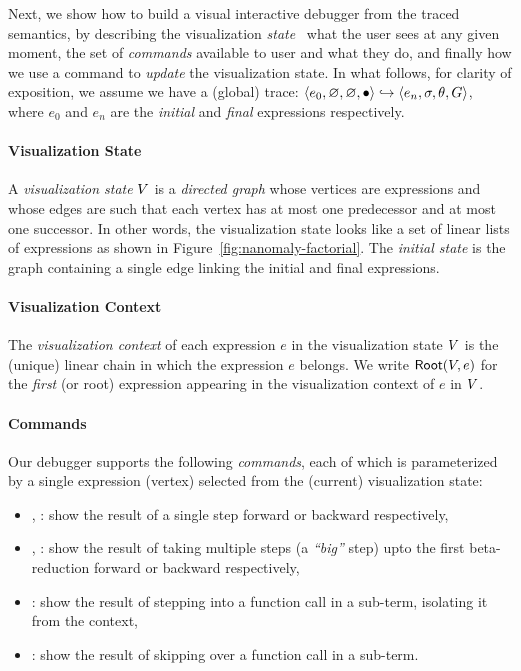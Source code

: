 Next, we show how to build a visual interactive debugger
from the traced semantics, by describing the visualization
\emph{state} \ie\ what the user sees at any given moment,
the set of \emph{commands} available to user and what
they do, and finally how we use a command to \emph{update}
the visualization state. In what follows, for clarity of
exposition, we assume we have a (global) trace:
$\langle e_0, \varnothing, \varnothing, \bullet \rangle \hookrightarrow \langle e_n, \sigma, \theta, G \rangle$, where
$e_0$ and $e_n$ are the \emph{initial} and \emph{final}
expressions respectively.

\paragraph{Visualization State}
%
A \emph{visualization state} $V$ is a \emph{directed graph}
whose vertices are expressions and whose edges are such
that each vertex has at most one predecessor and at most one
successor. In other words, the visualization state looks
like a set of linear lists of expressions as shown in
Figure~\ref{fig:nanomaly-factorial}.
%
The \emph{initial state} is the graph containing a single
edge linking the initial and final expressions.

\paragraph{Visualization Context}
%
The \emph{visualization context} of each expression $e$
in the visualization state $V$ is the (unique) linear chain
in which the expression $e$ belongs.
%
We write $\mathsf{Root}(V, e)$ for the \emph{first} (or root)
expression appearing in the visualization context of $e$ in
$V$.

\paragraph{Commands}
Our debugger supports the following \emph{commands}, each of which
is parameterized by a single expression (vertex) selected from the
(current) visualization state:
%
\begin{itemize}
%
\item \stepforwardsym, \stepbackwardsym:
      show the result of a single step forward or backward respectively,
%
\item \jumpforwardsym, \jumpbackwardsym:
      show the result of taking multiple steps (a \emph{``big''} step)
      upto the first beta-reduction forward or backward respectively,
%
\item \stepintosym:
      show the result of stepping into a function call in a sub-term,
      isolating it from the context,

\item \stepoversym:
      show the result of skipping over a function call in a sub-term.
\end{itemize}

